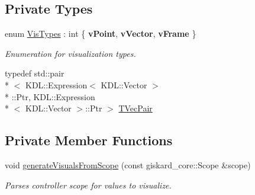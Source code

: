 \subsection*{Private Types}
\begin{DoxyCompactItemize}
\item 
enum \hyperlink{classGiskardActionServer_a3dcd42d3ccb136a49377b68bcdf21078}{Vis\-Types} \-: int \{ {\bfseries v\-Point}, 
{\bfseries v\-Vector}, 
{\bfseries v\-Frame}
 \}
\begin{DoxyCompactList}\small\item\em Enumeration for visualization types. \end{DoxyCompactList}\item 
typedef std\-::pair\\*
$<$ K\-D\-L\-::\-Expression$<$ K\-D\-L\-::\-Vector $>$\\*
\-::Ptr, K\-D\-L\-::\-Expression\\*
$<$ K\-D\-L\-::\-Vector $>$\-::Ptr $>$ \hyperlink{classGiskardActionServer_a49b67ed22398144efcae8cf2d6596f9e}{T\-Vec\-Pair}
\end{DoxyCompactItemize}
\subsection*{Private Member Functions}
\begin{DoxyCompactItemize}
\item 
void \hyperlink{classGiskardActionServer_a4164a1043930f6575d011e3fb7bbb207}{generate\-Visuals\-From\-Scope} (const giskard\-\_\-core\-::\-Scope \&scope)
\begin{DoxyCompactList}\small\item\em Parses controller scope for values to visualize. \end{DoxyCompactList}\end{DoxyCompactItemize}
